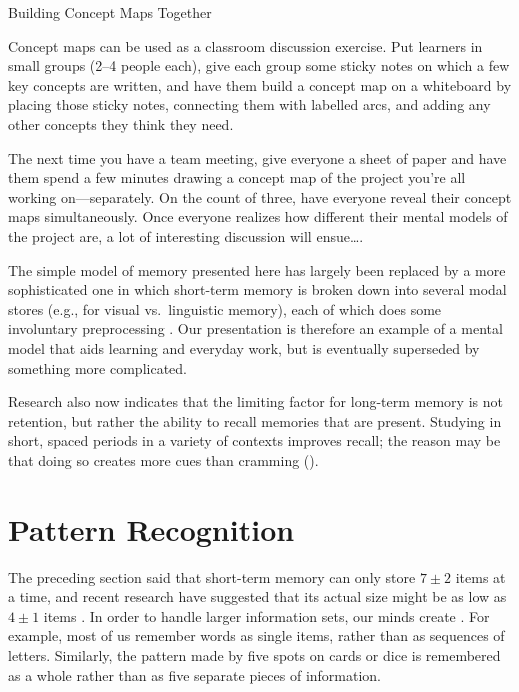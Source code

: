 \begin{callout}{Building Concept Maps Together}

  Concept maps can be used as a classroom discussion exercise. Put
  learners in small groups (2--4 people each), give each group some
  sticky notes on which a few key concepts are written, and have them
  build a concept map on a whiteboard by placing those sticky notes,
  connecting them with labelled arcs, and adding any other concepts
  they think they need.

  The next time you have a team meeting, give everyone a sheet of
  paper and have them spend a few minutes drawing a concept map of the
  project you're all working on---separately. On the count of three,
  have everyone reveal their concept maps simultaneously. Once
  everyone realizes how different their mental models of the project
  are, a lot of interesting discussion will ensue{\ldots}.

\end{callout}

The simple model of memory presented here has largely been replaced by
a more sophisticated one in which short-term memory is broken down
into several modal stores (e.g., for visual vs.\ linguistic memory),
each of which does some involuntary preprocessing \cite{Mill2016a}.
Our presentation is therefore an example of a mental model that aids
learning and everyday work, but is eventually superseded by something
more complicated.

Research also now indicates that the limiting factor for long-term
memory is not retention, but rather the ability to recall memories
that are present.  Studying in short, spaced periods in a variety of
contexts improves recall; the reason may be that doing so creates more
cues than cramming ().

\section{Pattern Recognition}\label{s:memory-pattern}

The preceding section said that short-term memory can only store
$7{\pm}2$ items at a time, and recent research have suggested that its
actual size might be as low as $4{\pm}1$ items \cite{Dida2016}.  In
order to handle larger information sets, our minds create
. For example, most of us remember words
as single items, rather than as sequences of letters. Similarly, the
pattern made by five spots on cards or dice is remembered as a whole
rather than as five separate pieces of information.

